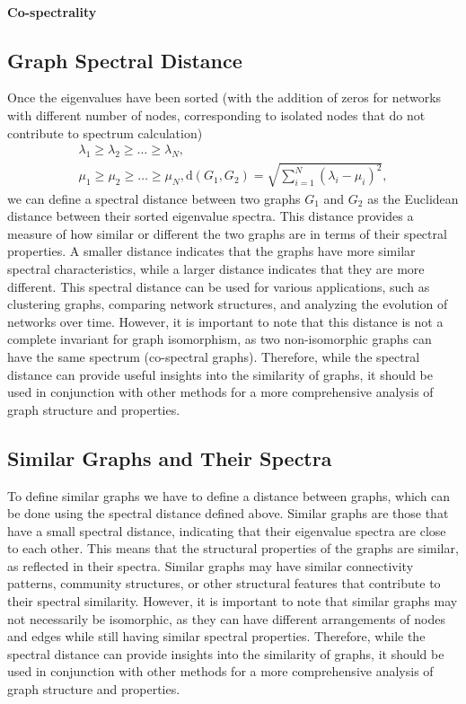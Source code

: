 \paragraph{Co-spectrality}

\subsection{Graph Spectral Distance}

Once the eigenvalues have been sorted (with the addition of zeros for networks with different number of nodes, corresponding to isolated nodes that do not contribute to spectrum calculation)
\[
    \begin{aligned}
        \lambda_1 \geq \lambda_2 \geq \ldots \geq \lambda_N, \\
        \mu_1 \geq \mu_2 \geq \ldots \geq \mu_N,
        \mathrm{d}(G_1, G_2) = \sqrt{\sum_{i=1}^N (\lambda_i - \mu_i)^2},
    \end{aligned}
\]
we can define a spectral distance between two graphs \(G_1\) and \(G_2\) as the Euclidean distance between their sorted eigenvalue spectra. This distance provides a measure of how similar or different the two graphs are in terms of their spectral properties. A smaller distance indicates that the graphs have more similar spectral characteristics, while a larger distance indicates that they are more different. This spectral distance can be used for various applications, such as clustering graphs, comparing network structures, and analyzing the evolution of networks over time. However, it is important to note that this distance is not a complete invariant for graph isomorphism, as two non-isomorphic graphs can have the same spectrum (co-spectral graphs). Therefore, while the spectral distance can provide useful insights into the similarity of graphs, it should be used in conjunction with other methods for a more comprehensive analysis of graph structure and properties.

\subsection{Similar Graphs and Their Spectra}

To define similar graphs we have to define a distance between graphs, which can be done using the spectral distance defined above. Similar graphs are those that have a small spectral distance, indicating that their eigenvalue spectra are close to each other. This means that the structural properties of the graphs are similar, as reflected in their spectra. Similar graphs may have similar connectivity patterns, community structures, or other structural features that contribute to their spectral similarity. However, it is important to note that similar graphs may not necessarily be isomorphic, as they can have different arrangements of nodes and edges while still having similar spectral properties. Therefore, while the spectral distance can provide insights into the similarity of graphs, it should be used in conjunction with other methods for a more comprehensive analysis of graph structure and properties.

